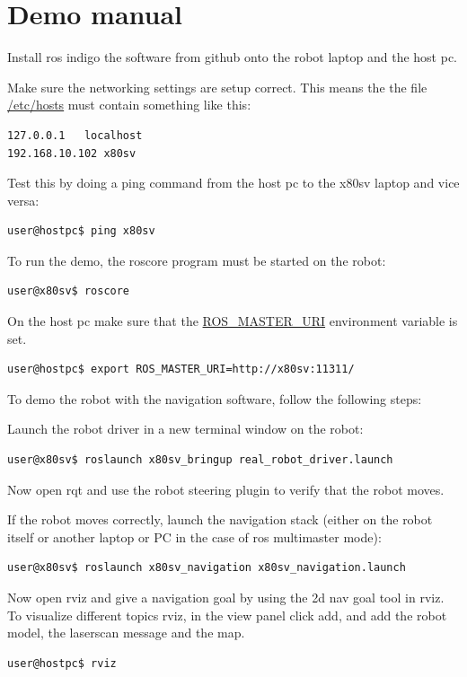 \documentclass[a4paper]{article}
\begin{document}
\appendix

\section{Demo manual}
Install ros indigo the software from github \cite{x80sv} onto the robot laptop and the host pc.

Make sure the networking settings are setup correct. This means the the file
\url{/etc/hosts} must contain something like this:

\begin{lstlisting}
127.0.0.1   localhost
192.168.10.102 x80sv
\end{lstlisting}

Test this by doing a ping command from the host pc to the x80sv laptop and
vice versa:

\begin{lstlisting}
user@hostpc$ ping x80sv
\end{lstlisting}

To run the demo, the roscore program must be started on the robot:
\begin{lstlisting}
user@x80sv$ roscore
\end{lstlisting}

On the host pc make sure that the \url{ROS_MASTER_URI} environment variable is
set.

\begin{lstlisting}
user@hostpc$ export ROS_MASTER_URI=http://x80sv:11311/
\end{lstlisting}

To demo the robot with the navigation software, follow the following steps:

Launch the robot driver in a new terminal window on the robot:
\begin{lstlisting}
user@x80sv$ roslaunch x80sv_bringup real_robot_driver.launch
\end{lstlisting}

Now open rqt and use the robot steering plugin to verify that the robot moves.

If the robot moves correctly, launch the navigation stack (either on the robot itself
or another laptop or PC in the case of ros multimaster mode):
\begin{lstlisting}
user@x80sv$ roslaunch x80sv_navigation x80sv_navigation.launch
\end{lstlisting}

Now open rviz and give a navigation goal by using the 2d nav goal tool in rviz.
To visualize different topics rviz, in the view panel click add, and add the robot
model, the laserscan message and the map.

\begin{lstlisting}
user@hostpc$ rviz
\end{lstlisting}
\end{document}
